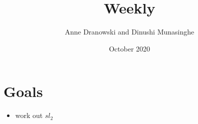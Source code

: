\documentclass{article}
\title{Weekly}
\author{Anne Dranowski and Dinushi Munasinghe}
\date{October 2020}
\begin{document}
\maketitle

\section*{Goals}

\begin{itemize}
    \item work out $sl_2$
\end{itemize}


\end{document}
